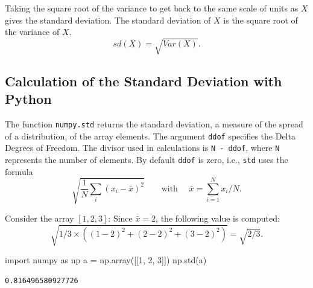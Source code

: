 \documentclass[
  letterpaper,
  DIV=11,
  numbers=noendperiod]{scrreprt}
\newenvironment{Shaded}{\begin{snugshade}}{\end{snugshade}}
\newcommand{\DecValTok}[1]{\textcolor[rgb]{0.68,0.00,0.00}{#1}}
\newcommand{\ImportTok}[1]{\textcolor[rgb]{0.00,0.46,0.62}{#1}}
\newcommand{\NormalTok}[1]{\textcolor[rgb]{0.00,0.23,0.31}{#1}}
\newcommand{\OperatorTok}[1]{\textcolor[rgb]{0.37,0.37,0.37}{#1}}
\begin{document}
Taking the square root of the variance to get back to the same scale of
units as \(X\) gives the standard deviation. The standard deviation of
\(X\) is the square root of the variance of \(X\). \begin{equation}
sd(X) = \sqrt{Var(X)}.
\end{equation}

\hypertarget{calculation-of-the-standard-deviation-with-python}{%
\subsection{Calculation of the Standard Deviation with
Python}\label{calculation-of-the-standard-deviation-with-python}}

The function \texttt{numpy.std} returns the standard deviation, a
measure of the spread of a distribution, of the array elements. The
argument \texttt{ddof} specifies the Delta Degrees of Freedom. The
divisor used in calculations is \texttt{N\ -\ ddof}, where \texttt{N}
represents the number of elements. By default \texttt{ddof} is zero,
i.e., \texttt{std} uses the formula
\begin{equation}  \sqrt{  \frac{1}{N} \sum_i \left( x_i - \bar{x} \right)^2  } \qquad \text{with } \quad \bar{x} = \sum_{i=1}^N x_i /N. \end{equation}

\begin{tcolorbox}[enhanced jigsaw, arc=.35mm, colback=white, bottomtitle=1mm, toprule=.15mm, coltitle=black, titlerule=0mm, leftrule=.75mm, title=\textcolor{quarto-callout-note-color}{\faInfo}\hspace{0.5em}{Example: Standard Deviation with Python}, opacitybacktitle=0.6, breakable, colbacktitle=quarto-callout-note-color!10!white, opacityback=0, toptitle=1mm, rightrule=.15mm, left=2mm, colframe=quarto-callout-note-color-frame, bottomrule=.15mm]

Consider the array \([1,2,3]\): Since \(\bar{x} = 2\), the following
value is computed:
\[ \sqrt{1/3 \times \left( (1-2)^2 + (2-2)^2 + (3-2)^2  \right)} = \sqrt{2/3}.\]

\begin{Shaded}
\begin{Highlighting}[]
\ImportTok{import}\NormalTok{ numpy }\ImportTok{as}\NormalTok{ np}
\NormalTok{a }\OperatorTok{=}\NormalTok{ np.array([[}\DecValTok{1}\NormalTok{, }\DecValTok{2}\NormalTok{, }\DecValTok{3}\NormalTok{]])}
\NormalTok{np.std(a)}
\end{Highlighting}
\end{Shaded}

\begin{verbatim}
0.816496580927726
\end{verbatim}

\end{tcolorbox}
\end{document}
